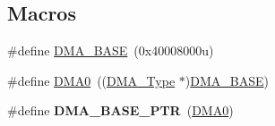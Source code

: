 \subsection*{Macros}
\begin{DoxyCompactItemize}
\item 
\#define \hyperlink{group__DMA__Peripheral__Access__Layer_gab04dd812f37907dc8bd6ed82e346b563}{D\+M\+A\+\_\+\+B\+A\+SE}~(0x40008000u)
\item 
\#define \hyperlink{group__DMA__Peripheral__Access__Layer_ga4103044f9ca209772f513dc694513ffb}{D\+M\+A0}~((\hyperlink{structDMA__Type}{D\+M\+A\+\_\+\+Type} $\ast$)\hyperlink{group__DMA__Peripheral__Access__Layer_gab04dd812f37907dc8bd6ed82e346b563}{D\+M\+A\+\_\+\+B\+A\+SE})
\item 
\#define {\bfseries D\+M\+A\+\_\+\+B\+A\+S\+E\+\_\+\+P\+TR}~(\hyperlink{group__DMA__Peripheral__Access__Layer_ga4103044f9ca209772f513dc694513ffb}{D\+M\+A0})\hypertarget{group__DMA__Peripheral__Access__Layer_ga6997fbc1b1973e9f27170217a3bd6f22}{}\label{group__DMA__Peripheral__Access__Layer_ga6997fbc1b1973e9f27170217a3bd6f22}


\end{DoxyCompactItemize}
